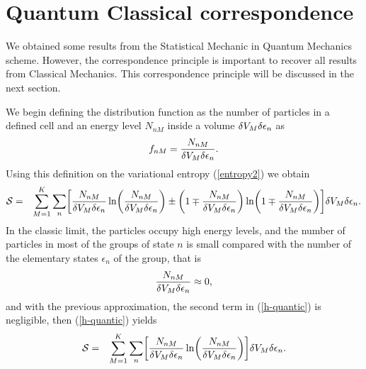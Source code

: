 \section{Quantum Classical correspondence}\label{sec:qccorrespondence}


We obtained some results from the Statistical Mechanic in Quantum Mechanics
scheme. However, the correspondence principle is important to recover all
results from Classical Mechanics. This correspondence principle will be
discussed in the next section.

We begin defining the distribution function as the number of particles in a defined cell and an energy level $N_{nM}$ inside a volume $\delta V_M \delta \epsilon_n$ as
\begin{equation}
    f_{nM}=\frac{N_{nM}}{ \delta V_M \delta \epsilon_{n} }.
\end{equation}
Using this definition on the variational entropy (\ref{entropy2}) we obtain
\begin{eqnarray}
    \Ss&=& \sum_{M=1}^{K} \sum_n
    \left[  
           \frac{N_{nM}}{ \de V_M\delta \epsilon_{n}} \ln 
           \left( 
                  \frac{N_{nM}}{ \de V_M\delta \epsilon_{n}}
           \right)\pm 
           \left(  
                  1\mp \frac{N_{nM}}{ \de V_M \delta \epsilon_{n}}
           \right) \ln 
           \left(  
                   1\mp \frac{N_{nM}}{ \de V_M \delta \epsilon_{n}}
           \right)
    \right] \de V_M \delta \epsilon_{n}. \nonumber \\
    \label{h-quantic} 
\end{eqnarray}
In the classic limit, the particles occupy high energy levels, and the number of particles in most of the groups of state $n$ is small compared with the number of the elementary states $\epsilon_n$ of the group, that is
\begin{equation}
    \frac{N_{nM}}{ \delta V_M \delta \epsilon_{n} } \approx 0,
\end{equation}
and with the previous approximation, the second term in (\ref{h-quantic}) is negligible, then (\ref{h-quantic}) yields
\begin{eqnarray}
    \Ss&=& \sum_{M=1}^{K} \sum_n
    \left[  
           \frac{N_{nM}}{ \de V_M \delta \epsilon_{n}} \ln 
           \left( 
                  \frac{N_{nM}}{ \de V_M \delta \epsilon_{n}}
           \right)
    \right] \de V_M \delta \epsilon_{n}. \label{h-quantic2}
\end{eqnarray}
